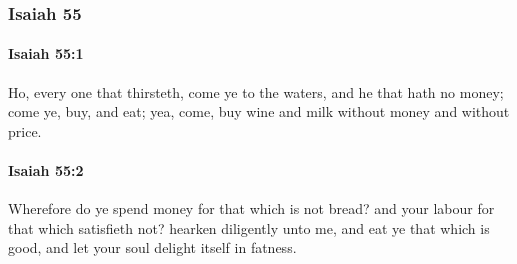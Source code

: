 	\subsubsection{Isaiah 55} %
		\label{ISAIAH-55}

		\paragraph{Isaiah 55:1} %
			\label{ISAIAH-55-1}

			Ho, every one that thirsteth, come ye to the waters, and he that hath no money; come ye, buy, and eat; yea, come, buy wine and milk without money and without price.


		\paragraph{Isaiah 55:2} %
			\label{ISAIAH-55-2}

			Wherefore do ye spend money for that which is not bread? and your labour for that which satisfieth not? hearken diligently unto me, and eat ye that which is good, and let your soul delight itself in fatness.

